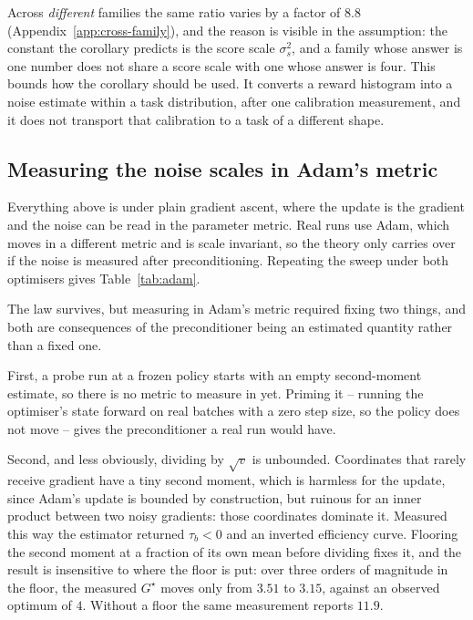 Across \emph{different} families the same ratio varies by a factor of $8.8$
(Appendix~\ref{app:cross-family}), and the reason is visible in the assumption: the constant the corollary
predicts is the score scale $\sigma_s^2$, and a family whose answer is one number does not share a
score scale with one whose answer is four. This bounds how the corollary should be used. It
converts a reward histogram into a noise estimate within a task distribution, after one calibration
measurement, and it does not transport that calibration to a task of a different shape.

\subsection{Measuring the noise scales in Adam's metric}
\label{sec:adam}

Everything above is under plain gradient ascent, where the update is the gradient and the noise can
be read in the parameter metric. Real runs use Adam, which moves in a different metric and is scale
invariant, so the theory only carries over if the noise is measured after preconditioning. Repeating
the sweep under both optimisers gives Table~\ref{tab:adam}.

\begin{table}[t]
  \centering
  
  \caption{The same sweep under gradient ascent and under Adam. The optimum is at $G = 4$ for both,
  and the predicted curve explains the measured one about as well. The measured $G^{\star}$ for Adam is
  taken in Adam's own metric, which takes some care -- see below.}
  \label{tab:adam}
\end{table}

The law survives, but measuring in Adam's metric required fixing two things, and both are
consequences of the preconditioner being an estimated quantity rather than a fixed one.

First, a probe run at a frozen policy starts with an empty second-moment estimate, so there is no
metric to measure in yet. Priming it -- running the optimiser's state forward on real batches with
a zero step size, so the policy does not move -- gives the preconditioner a real run would have.

Second, and less obviously, dividing by $\sqrt{v}$ is unbounded. Coordinates that rarely receive
gradient have a tiny second moment, which is harmless for the update, since Adam's update is
bounded by construction, but ruinous for an inner product between two noisy gradients: those
coordinates dominate it. Measured this way the estimator returned $\tau_b < 0$ and an inverted
efficiency curve. Flooring the second moment at a fraction of its own mean before dividing fixes
it, and the result is insensitive to where the floor is put: over three orders of magnitude in the
floor, the measured $G^{\star}$ moves only from $3.51$ to $3.15$, against an observed optimum of $4$.
Without a floor the same measurement reports $11.9$.


